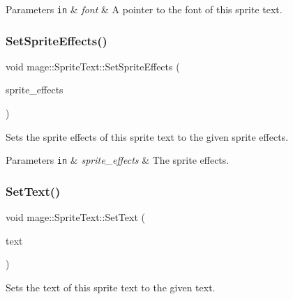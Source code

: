 \begin{DoxyParams}[1]{Parameters}
\mbox{\tt in}  & {\em font} & A pointer to the font of this sprite text. \\
\hline
\end{DoxyParams}
\hypertarget{classmage_1_1_sprite_text_ab457137566eb5a57562c7ff6d387fc93}{}\label{classmage_1_1_sprite_text_ab457137566eb5a57562c7ff6d387fc93} 
\subsubsection{\texorpdfstring{Set\+Sprite\+Effects()}{SetSpriteEffects()}}
{\footnotesize\ttfamily void mage\+::\+Sprite\+Text\+::\+Set\+Sprite\+Effects (\begin{DoxyParamCaption}\item[{\hyperlink{namespacemage_ad62ebdf0e7aae0caf1535a4ea3f056ea}{Sprite\+Effect}}]{sprite\+\_\+effects }\end{DoxyParamCaption})\hspace{0.3cm}{\ttfamily [noexcept]}}

Sets the sprite effects of this sprite text to the given sprite effects.


\begin{DoxyParams}[1]{Parameters}
\mbox{\tt in}  & {\em sprite\+\_\+effects} & The sprite effects. \\
\hline
\end{DoxyParams}
\hypertarget{classmage_1_1_sprite_text_a6853a914502bb28cfc4dc14160345542}{}\label{classmage_1_1_sprite_text_a6853a914502bb28cfc4dc14160345542} 
\subsubsection{\texorpdfstring{Set\+Text()}{SetText()}}
{\footnotesize\ttfamily void mage\+::\+Sprite\+Text\+::\+Set\+Text (\begin{DoxyParamCaption}\item[{\hyperlink{classmage_1_1_color_string}{Color\+String}}]{text }\end{DoxyParamCaption})}

Sets the text of this sprite text to the given text.


